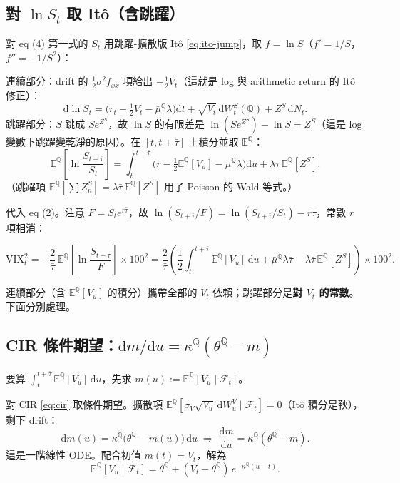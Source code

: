 \documentclass[12pt, a4paper]{article}
\theoremstyle{remark}
\newcommand{\E}{\mathbb{E}}
\newcommand{\Q}{\mathbb{Q}}
\newcommand{\dd}{\mathrm{d}}
\newcommand{\VIX}{\mathrm{VIX}}
\begin{document}
\subsection{對 $\ln S_t$ 取 Itô（含跳躍）}

對 eq (4) 第一式的 $S_t$ 用跳躍-擴散版 Itô \eqref{eq:ito-jump}，取 $f=\ln S$（$f'=1/S$，$f''=-1/S^2$）：

\begin{derivbox}
連續部分：drift 的 $\frac12\sigma^2 f_{xx}$ 項給出 $-\frac12 V_t$（這就是 log 與 arithmetic return 的 Itô 修正）：
\[
  \dd\ln S_t = \Big(r_t - \tfrac12 V_t - \bar\mu^\Q\lambda\Big)\dd t + \sqrt{V_t}\,\dd W_t^{S}(\Q)
  + Z^S\,\dd N_t.
\]
跳躍部分：$S$ 跳成 $S e^{Z^S}$，故 $\ln S$ 的有限差是 $\ln(Se^{Z^S})-\ln S = Z^S$（這是 log 變數下跳躍變乾淨的原因）。在 $[t,t+\bar\tau]$ 上積分並取 $\E^\Q$：
\[
  \E^\Q\!\left[\ln\frac{S_{t+\bar\tau}}{S_t}\right]
  = \int_t^{t+\bar\tau}\!\Big(r - \tfrac12\E^\Q[V_u] - \bar\mu^\Q\lambda\Big)\dd u
  + \lambda\bar\tau\,\E^\Q[Z^S].
\]
（跳躍項 $\E^\Q[\sum Z_n^S]=\lambda\bar\tau\,\E^\Q[Z^S]$ 用了 Poisson 的 Wald 等式。）
\end{derivbox}

代入 eq (2)。注意 $F=S_te^{r\bar\tau}$，故 $\ln(S_{t+\bar\tau}/F)=\ln(S_{t+\bar\tau}/S_t)-r\bar\tau$，常數 $r$ 項相消：

\[
  \VIX_t^2 = -\frac{2}{\bar\tau}\,\E^\Q\!\left[\ln\frac{S_{t+\bar\tau}}{F}\right]\times100^2
  = \frac{2}{\bar\tau}\!\left(\frac12\!\int_t^{t+\bar\tau}\!\!\E^\Q[V_u]\,\dd u
  + \bar\mu^\Q\lambda\bar\tau - \lambda\bar\tau\,\E^\Q[Z^S]\right)\times100^2.
\]

連續部分（含 $\E^\Q[V_u]$ 的積分）攜帶全部的 $V_t$ 依賴；跳躍部分是\textbf{對 $V_t$ 的常數}。下面分別處理。

\subsection{CIR 條件期望：$\dd m/\dd u = \kappa^\Q(\theta^\Q-m)$}

要算 $\int_t^{t+\bar\tau}\E^\Q[V_u]\,\dd u$，先求 $m(u):=\E^\Q[V_u\mid\mathcal F_t]$。

\begin{derivbox}
對 CIR \eqref{eq:cir} 取條件期望。擴散項 $\E^\Q[\sigma_V\sqrt{V_u}\,\dd W_u^V\mid\mathcal F_t]=0$（Itô 積分是鞅），剩下 drift：
\[
  \dd m(u) = \kappa^\Q\big(\theta^\Q - m(u)\big)\,\dd u
  \;\Longrightarrow\;
  \frac{\dd m}{\dd u} = \kappa^\Q(\theta^\Q - m).
\]
這是一階線性 ODE。配合初值 $m(t)=V_t$，解為
\begin{equation}
  \E^\Q[V_u\mid\mathcal F_t] = \theta^\Q + (V_t-\theta^\Q)\,e^{-\kappa^\Q(u-t)}.
  \tag{$\star$6}\label{eq:cir-mean}
\end{equation}
\end{derivbox}
\end{document}
